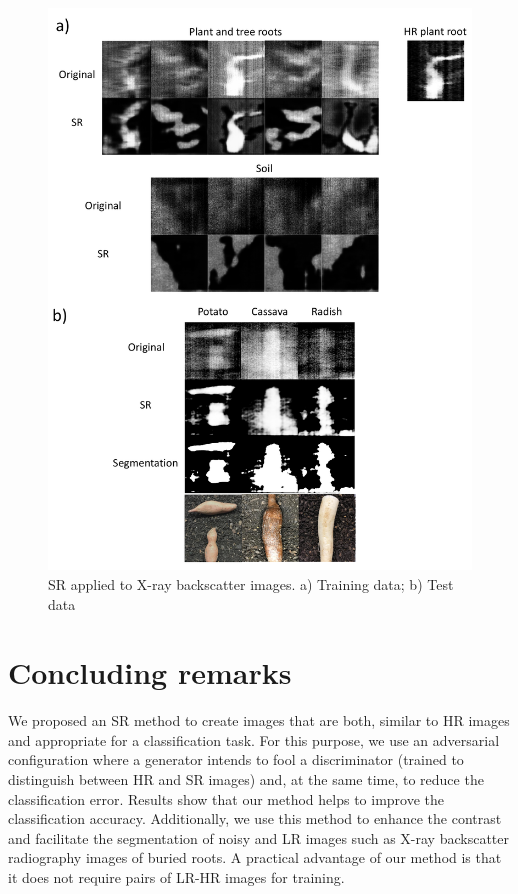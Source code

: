 \documentclass[10pt,twocolumn,letterpaper]{article}
\begin{document}
\begin{figure}[h]
\begin{center}
\includegraphics[scale=0.60]{results/srxray.pdf}
\end{center}
   \caption{SR applied to X-ray backscatter images. a) Training data; b) Test data}
\label{fig:srtest}
\end{figure}

\section{Concluding remarks}
\label{sec:conclusion}

We proposed an SR method to create images that are both, similar to HR images and appropriate for a classification task. For this purpose, we use an adversarial configuration where a generator intends to fool a discriminator (trained to distinguish between HR and SR images) and, at the same time, to reduce the classification error. Results show that our method helps to improve the classification accuracy. Additionally, we use this method to enhance the contrast and facilitate the segmentation of noisy and LR images such as X-ray backscatter radiography images of buried roots. A practical advantage of our method is that it does not require pairs of LR-HR images for training.
\end{document}
